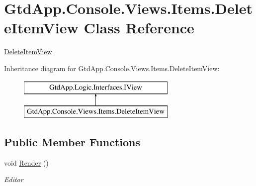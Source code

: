 \hypertarget{class_gtd_app_1_1_console_1_1_views_1_1_items_1_1_delete_item_view}{}\section{Gtd\+App.\+Console.\+Views.\+Items.\+Delete\+Item\+View Class Reference}
\label{class_gtd_app_1_1_console_1_1_views_1_1_items_1_1_delete_item_view}


\mbox{\hyperlink{class_gtd_app_1_1_console_1_1_views_1_1_items_1_1_delete_item_view}{Delete\+Item\+View}}  


Inheritance diagram for Gtd\+App.\+Console.\+Views.\+Items.\+Delete\+Item\+View\+:\begin{figure}[H]
\begin{center}
\leavevmode
\includegraphics[height=2.000000cm]{class_gtd_app_1_1_console_1_1_views_1_1_items_1_1_delete_item_view}
\end{center}
\end{figure}
\subsection*{Public Member Functions}
\begin{DoxyCompactItemize}
\item 
void \mbox{\hyperlink{class_gtd_app_1_1_console_1_1_views_1_1_items_1_1_delete_item_view_acce0bea7842b8ba472083fcfc21329f0}{Render}} ()
\begin{DoxyCompactList}\small\item\em Editor \end{DoxyCompactList}\end{DoxyCompactItemize}
